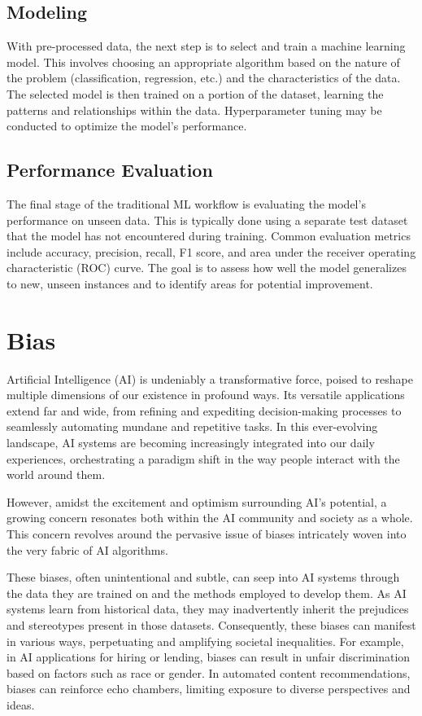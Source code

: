 \documentclass[12pt,a4paper,openright,twoside]{book}
\begin{document}
\subsection{Modeling}

With pre-processed data, the next step is to select and train a machine learning model. This involves choosing an appropriate algorithm based on the nature of the problem (classification, regression, etc.) and the characteristics of the data. The selected model is then trained on a portion of the dataset, learning the patterns and relationships within the data. Hyperparameter tuning may be conducted to optimize the model's performance.

\subsection{Performance Evaluation}

The final stage of the traditional ML workflow is evaluating the model's performance on unseen data. This is typically done using a separate test dataset that the model has not encountered during training. Common evaluation metrics include accuracy, precision, recall, F1 score, and area under the receiver operating characteristic (ROC) curve. The goal is to assess how well the model generalizes to new, unseen instances and to identify areas for potential improvement.

\newpage
\section{Bias}

Artificial Intelligence (AI) is undeniably a transformative force, poised to reshape multiple dimensions of our existence in profound ways. Its versatile applications extend far and wide, from refining and expediting decision-making processes to seamlessly automating mundane and repetitive tasks. In this ever-evolving landscape, AI systems are becoming increasingly integrated into our daily experiences, orchestrating a paradigm shift in the way people interact with the world around them. 

However, amidst the excitement and optimism surrounding AI's potential, a growing concern resonates both within the AI community and society as a whole. This concern revolves around the pervasive issue of biases intricately woven into the very fabric of AI algorithms. 

These biases, often unintentional and subtle, can seep into AI systems through the data they are trained on and the methods employed to develop them. As AI systems learn from historical data, they may inadvertently inherit the prejudices and stereotypes present in those datasets. Consequently, these biases can manifest in various ways, perpetuating and amplifying societal inequalities. For example, in AI applications for hiring or lending, biases can result in unfair discrimination based on factors such as race or gender. In automated content recommendations, biases can reinforce echo chambers, limiting exposure to diverse perspectives and ideas. 
\end{document}
